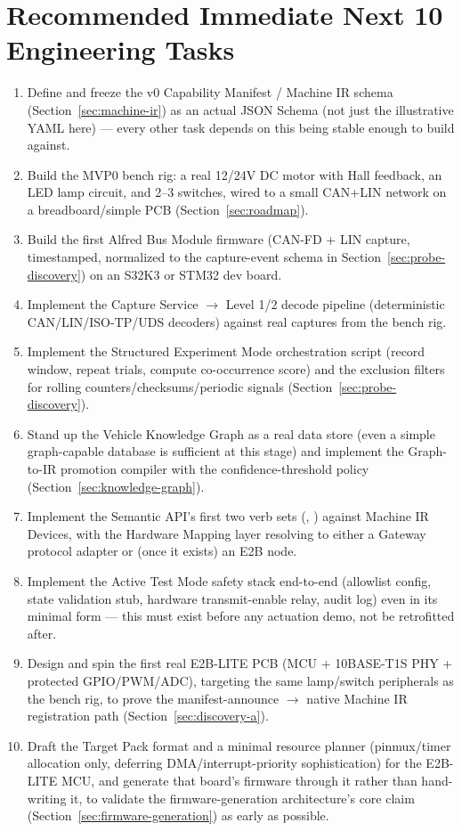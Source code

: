 \section{Recommended Immediate Next 10 Engineering Tasks}
\label{sec:next-steps}

\begin{enumerate}
\item Define and freeze the v0 Capability Manifest / Machine IR schema (Section~\ref{sec:machine-ir}) as an actual JSON Schema (not just the illustrative YAML here) --- every other task depends on this being stable enough to build against.
\item Build the MVP0 bench rig: a real 12/24V DC motor with Hall feedback, an LED lamp circuit, and 2--3 switches, wired to a small CAN+LIN network on a breadboard/simple PCB (Section~\ref{sec:roadmap}).
\item Build the first Alfred Bus Module firmware (CAN-FD + LIN capture, timestamped, normalized to the capture-event schema in Section~\ref{sec:probe-discovery}) on an S32K3 or STM32 dev board.
\item Implement the Capture Service $\rightarrow$ Level 1/2 decode pipeline (deterministic CAN/LIN/ISO-TP/UDS decoders) against real captures from the bench rig.
\item Implement the Structured Experiment Mode orchestration script (record window, repeat trials, compute co-occurrence score) and the exclusion filters for rolling counters/checksums/periodic signals (Section~\ref{sec:probe-discovery}).
\item Stand up the Vehicle Knowledge Graph as a real data store (even a simple graph-capable database is sufficient at this stage) and implement the Graph-to-IR promotion compiler with the confidence-threshold policy (Section~\ref{sec:knowledge-graph}).
\item Implement the Semantic API's first two verb sets (, ) against Machine IR Devices, with the Hardware Mapping layer resolving to either a Gateway protocol adapter or (once it exists) an E2B node.
\item Implement the Active Test Mode safety stack end-to-end (allowlist config, state validation stub, hardware transmit-enable relay, audit log) even in its minimal form --- this must exist before any actuation demo, not be retrofitted after.
\item Design and spin the first real E2B-LITE PCB (MCU + 10BASE-T1S PHY + protected GPIO/PWM/ADC), targeting the same lamp/switch peripherals as the bench rig, to prove the manifest-announce $\rightarrow$ native Machine IR registration path (Section~\ref{sec:discovery-a}).
\item Draft the Target Pack format and a minimal resource planner (pinmux/timer allocation only, deferring DMA/interrupt-priority sophistication) for the E2B-LITE MCU, and generate that board's firmware through it rather than hand-writing it, to validate the firmware-generation architecture's core claim (Section~\ref{sec:firmware-generation}) as early as possible.
\end{enumerate}
